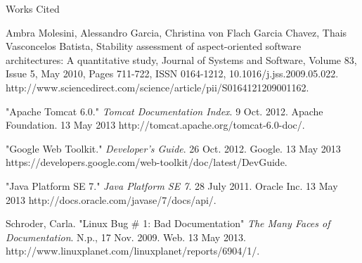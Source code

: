 \documentclass[a4paper,12pt]{texMemo}
\newcommand{\bibent}{\noindent \hangindent 40pt}
\newenvironment{workscited}{ \doublespacing \newpage \begin{center} Works Cited \end{center}}{\newpage }
\begin{document}
\begin{workscited}

  \bibent
 Ambra Molesini, Alessandro Garcia, Christina von Flach Garcia Chavez, Thais Vasconcelos Batista, Stability assessment of aspect-oriented software architectures: A quantitative study, Journal of Systems and Software, Volume 83, Issue 5, May 2010, Pages 711-722, ISSN 0164-1212, 10.1016/j.jss.2009.05.022.
\\http://www.sciencedirect.com/science/article/pii/S0164121209001162. 

 \bibent
 "Apache Tomcat 6.0." \textit{Tomcat Documentation Index}. 9 Oct. 2012. Apache Foundation.  13 May 2013 http://tomcat.apache.org/tomcat-6.0-doc/. 

 \bibent
 "Google Web Toolkit." \textit{Developer's Guide}. 26 Oct. 2012. Google. 13 May 2013 \\https://developers.google.com/web-toolkit/doc/latest/DevGuide. 

 \bibent
 "Java Platform SE 7." \textit{Java Platform SE 7}. 28 July 2011. Oracle Inc. 13 May 2013 http://docs.oracle.com/javase/7/docs/api/. 


 \bibent
  Schroder, Carla. "Linux Bug \# 1: Bad Documentation" \textit{The Many Faces of Documentation}. N.p., 17 Nov. 2009. Web. 13 May 2013.\\ http://www.linuxplanet.com/linuxplanet/reports/6904/1/. 


 \end{workscited}
\end{document}
